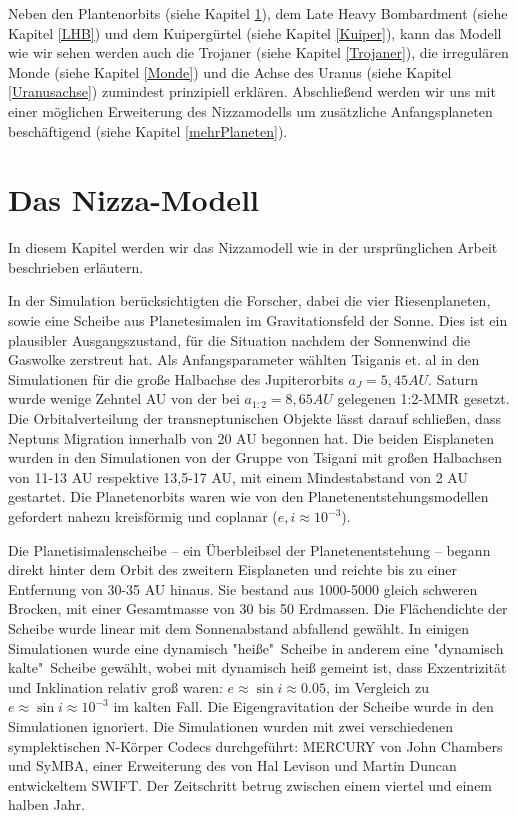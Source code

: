\documentclass[10pt,a4paper,twoside]{article}
\newcommand{\refsec}[1]{siehe Kapitel \ref{#1}}
\begin{document}
Neben den Plantenorbits (\refsec{Orbits}), dem Late Heavy Bombardment (\refsec{LHB}) und dem Kuipergürtel (\refsec{Kuiper}), kann das Modell wie wir sehen werden auch die Trojaner (\refsec{Trojaner}), die irregulären Monde (\refsec{Monde}) und die Achse des Uranus (\refsec{Uranusachse}) zumindest prinzipiell erklären.
Abschließend werden wir uns mit einer möglichen Erweiterung des Nizzamodells um zusätzliche Anfangsplaneten beschäftigend (\refsec{mehrPlaneten}).

\section{Das Nizza-Modell}\label{Orbits}
In diesem Kapitel werden wir das Nizzamodell wie in der ursprünglichen Arbeit\cite{Tsiganis2005} beschrieben erläutern.

In der Simulation berücksichtigten die Forscher, dabei die vier Riesenplaneten, sowie eine Scheibe aus Planetesimalen im Gravitationsfeld der Sonne. %
Dies ist ein plausibler Ausgangszustand, für die Situation nachdem der Sonnenwind die Gaswolke %
zerstreut hat. %
Als Anfangsparameter wählten Tsiganis et. al in den Simulationen für die große Halbachse des Jupiterorbits $a_J = 5,45 AU$. Saturn wurde wenige Zehntel AU von der bei $a_{1:2} = 8,65 AU$ gelegenen 1:2-MMR gesetzt\cite{Tsiganis2005}. Die Orbitalverteilung der transneptunischen Objekte lässt darauf schließen, dass Neptuns Migration innerhalb von 20 AU begonnen hat.\cite{Tsiganis2005}
Die beiden Eisplaneten wurden in den Simulationen von der Gruppe von Tsigani mit großen Halbachsen von 11-13 AU respektive 13,5-17 AU, mit einem Mindestabstand von 2 AU gestartet.
Die Planetenorbits waren wie von den Planetenentstehungsmodellen gefordert %
nahezu kreisförmig und coplanar ($e, i \approx 10^{-3}$).

Die Planetisimalenscheibe – ein Überbleibsel der Planetenentstehung – begann direkt hinter dem Orbit des zweitern Eisplaneten und reichte bis zu einer Entfernung von 30-35 AU\cite{Tsiganis2005} hinaus. Sie bestand aus 1000-5000 gleich schweren Brocken, mit einer Gesamtmasse von 30 bis 50 Erdmassen. %
Die Flächendichte der Scheibe wurde linear mit dem Sonnenabstand abfallend gewählt. In einigen Simulationen wurde eine dynamisch "heiße"\ Scheibe in anderem eine "dynamisch kalte"\ Scheibe gewählt, wobei mit dynamisch heiß gemeint ist, dass Exzentrizität und Inklination relativ groß waren: $e \approx \sin i \approx 0.05 $, im Vergleich zu $e \approx \sin i \approx 10^{-3} $ im kalten Fall.\cite{Tsiganis2005}
Die Eigengravitation der Scheibe wurde in den Simulationen ignoriert\cite{Tsiganis2005}.
Die Simulationen wurden mit zwei verschiedenen symplektischen N-Körper Codecs durchgeführt: MERCURY von John Chambers und SyMBA, einer Erweiterung des von Hal Levison und Martin Duncan entwickeltem SWIFT.
Der Zeitschritt betrug zwischen einem viertel und einem halben Jahr.\cite{Tsiganis2005} %
\end{document}
